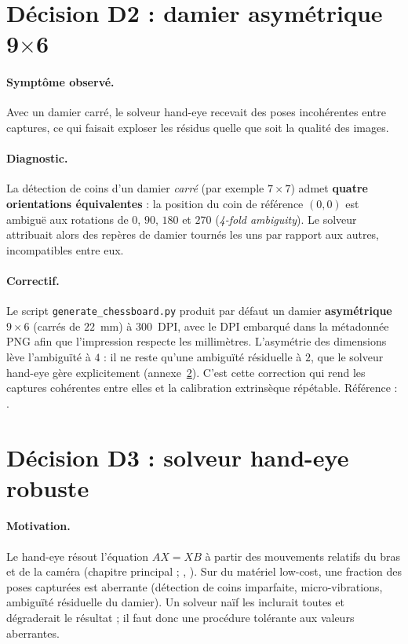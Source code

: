 \section{Décision D2 : damier asymétrique 9$\times$6}
\label{ann:d2}

\paragraph{Symptôme observé.}
Avec un damier carré, le solveur hand-eye recevait des poses incohérentes
entre captures, ce qui faisait exploser les résidus quelle que soit la qualité
des images.

\paragraph{Diagnostic.}
La détection de coins d'un damier \emph{carré} (par exemple $7\times7$) admet
\textbf{quatre orientations équivalentes} : la position du coin de référence
$(0,0)$ est ambiguë aux rotations de $0$\textdegree, $90$\textdegree,
$180$\textdegree{} et $270$\textdegree{} (\emph{4-fold ambiguity}). Le solveur
attribuait alors des repères de damier tournés les uns par rapport aux autres,
incompatibles entre eux.

\paragraph{Correctif.}
Le script \texttt{generate\_chessboard.py} produit par défaut un damier
\textbf{asymétrique $9\times6$} (carrés de $22$~mm) à $300$~DPI, avec le DPI
embarqué dans la métadonnée PNG afin que l'impression respecte les
millimètres. L'asymétrie des dimensions lève l'ambiguïté à $4$ : il ne reste
qu'une ambiguïté résiduelle à $2$, que le solveur hand-eye gère explicitement
(annexe~\ref{ann:d3}). C'est cette correction qui rend les captures cohérentes
entre elles et la calibration extrinsèque répétable. Référence :
\cite{zhang_flexible_2000}.

\section{Décision D3 : solveur hand-eye robuste}
\label{ann:d3}

\paragraph{Motivation.}
Le hand-eye résout l'équation $AX = XB$ à partir des mouvements relatifs du
bras et de la caméra (chapitre principal ; \cite{tsai_new_1989},
\cite{horaud_hand-eye_1995}). Sur du matériel low-cost, une fraction des poses
capturées est aberrante (détection de coins imparfaite, micro-vibrations,
ambiguïté résiduelle du damier). Un solveur naïf les inclurait toutes et
dégraderait le résultat ; il faut donc une procédure tolérante aux valeurs
aberrantes.

